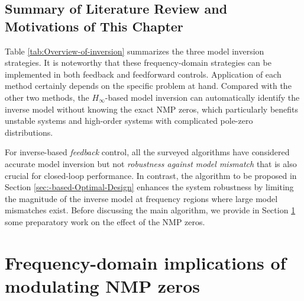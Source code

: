 \documentclass [11pt, proquest] {uwthesis}[2020/02/24]
\begin{document}
\subsection{Summary of Literature Review and Motivations of This Chapter}

Table \ref{tab:Overview-of-inversion} summarizes the three model
inversion strategies. It is noteworthy that these frequency-domain
strategies can be implemented in both feedback and feedforward controls.
Application of each method certainly depends on the specific problem
at hand. Compared with the other two methods, the $H_{\infty}$-based model
inversion can automatically identify the inverse model without knowing
the exact NMP zeros, which particularly benefits unstable systems
and high-order systems with complicated pole-zero distributions.

For inverse-based \emph{feedback} control, all the surveyed algorithms
have considered accurate model inversion but not \emph{robustness
against model mismatch} that is also crucial for closed-loop performance.
In contrast, the algorithm to be proposed in Section \ref{sec:-based-Optimal-Design}
enhances the system robustness by limiting the magnitude of the inverse
model at frequency regions where large model mismatches exist. Before
discussing the main algorithm, we provide in Section \ref{sec:NMP-zero-Modulation}
some preparatory work on the effect of the NMP zeros.

\section{Frequency-domain implications of modulating NMP zeros} \label{sec:NMP-zero-Modulation}
\end{document}
